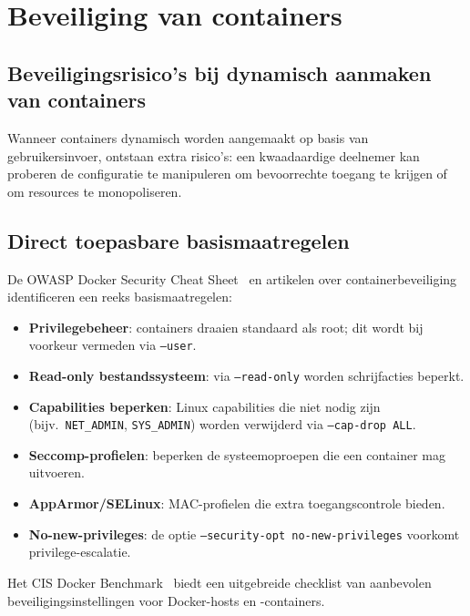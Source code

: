\section{Beveiliging van containers}%
\label{sec:containerbeveiliging}

\subsection{Beveiligingsrisico's bij dynamisch aanmaken van containers}

Wanneer containers dynamisch worden aangemaakt op basis van gebruikersinvoer, ontstaan extra risico's: een kwaadaardige deelnemer kan proberen de configuratie te manipuleren om bevoorrechte toegang te krijgen of om resources te monopoliseren.

\subsection{Direct toepasbare basismaatregelen}

De OWASP Docker Security Cheat Sheet~\autocite{OWASP2024} en artikelen over containerbeveiliging~\autocite{Aikido2025} identificeren een reeks basismaatregelen:

\begin{itemize}
  \item \textbf{Privilegebeheer}: containers draaien standaard als root; dit wordt bij voorkeur vermeden via \texttt{--user}.
  \item \textbf{Read-only bestandssysteem}: via \texttt{--read-only} worden schrijfacties beperkt.
  \item \textbf{Capabilities beperken}: Linux capabilities die niet nodig zijn (bijv.\ \texttt{NET\_ADMIN}, \texttt{SYS\_ADMIN}) worden verwijderd via \texttt{--cap-drop ALL}.
  \item \textbf{Seccomp-profielen}: beperken de systeemoproepen die een container mag uitvoeren.
  \item \textbf{AppArmor/SELinux}: MAC-profielen die extra toegangscontrole bieden.
  \item \textbf{No-new-privileges}: de optie \texttt{--security-opt no-new-privileges} voorkomt privilege-escalatie.
\end{itemize}

Het CIS Docker Benchmark~\autocite{CISDocker} biedt een uitgebreide checklist van aanbevolen beveiligingsinstellingen voor Docker-hosts en -containers.

